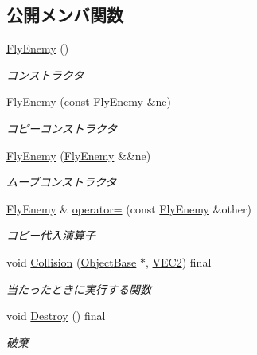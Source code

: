 \subsection*{公開メンバ関数}
\begin{DoxyCompactItemize}
\item 
\mbox{\hyperlink{class_fly_enemy_a92bb66e1f877440afab15a36ffebd74d}{Fly\+Enemy}} ()
\begin{DoxyCompactList}\small\item\em コンストラクタ \end{DoxyCompactList}\item 
\mbox{\hyperlink{class_fly_enemy_af206898a5e1b59cc7bba2e4c13b72384}{Fly\+Enemy}} (const \mbox{\hyperlink{class_fly_enemy}{Fly\+Enemy}} \&ne)
\begin{DoxyCompactList}\small\item\em コピーコンストラクタ \end{DoxyCompactList}\item 
\mbox{\hyperlink{class_fly_enemy_ad32ad41958e55f3028b0beb068813bc1}{Fly\+Enemy}} (\mbox{\hyperlink{class_fly_enemy}{Fly\+Enemy}} \&\&ne)
\begin{DoxyCompactList}\small\item\em ムーブコンストラクタ \end{DoxyCompactList}\item 
\mbox{\hyperlink{class_fly_enemy}{Fly\+Enemy}} \& \mbox{\hyperlink{class_fly_enemy_a6cc3f3701b503020620c02667705fd23}{operator=}} (const \mbox{\hyperlink{class_fly_enemy}{Fly\+Enemy}} \&other)
\begin{DoxyCompactList}\small\item\em コピー代入演算子 \end{DoxyCompactList}\item 
void \mbox{\hyperlink{class_fly_enemy_adaabf7ce270104e30df29bfa464d72ce}{Collision}} (\mbox{\hyperlink{class_object_base}{Object\+Base}} $\ast$, \mbox{\hyperlink{common_8h_afb0c5e21d4133ff4f200992c0b534e1b}{V\+E\+C2}}) final
\begin{DoxyCompactList}\small\item\em 当たったときに実行する関数 \end{DoxyCompactList}\item 
void \mbox{\hyperlink{class_fly_enemy_af7ce5137e8eb2e8cc6654fbbdbc714cd}{Destroy}} () final
\begin{DoxyCompactList}\small\item\em 破棄 \end{DoxyCompactList}\item 

\end{DoxyCompactItemize}
